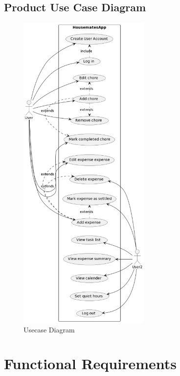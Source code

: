 \documentclass[12pt]{article}
\begin{document}
\subsection{Product Use Case Diagram}
\begin{figure}[H]
    \centering
	\includegraphics[width=6.5cm]{UseCase.png}
	\caption{Usecase Diagram}
 \label{}
\end{figure}




\section{Functional Requirements}
\end{document}
